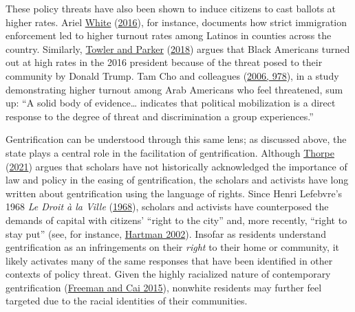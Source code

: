 \documentclass[
  12pt,
]{article}
\begin{document}
These policy threats have also been shown to induce citizens to cast ballots at higher rates. Ariel \protect\hyperlink{ref-White2016}{White} (\protect\hyperlink{ref-White2016}{2016}), for instance, documents how strict immigration enforcement led to higher turnout rates among Latinos in counties across the country. Similarly, \protect\hyperlink{ref-Towler2018}{Towler and Parker} (\protect\hyperlink{ref-Towler2018}{2018}) argues that Black Americans turned out at high rates in the 2016 president because of the threat posed to their community by Donald Trump. Tam Cho and colleagues (\protect\hyperlink{ref-TamCho2006a}{2006, 978}), in a study demonstrating higher turnout among Arab Americans who feel threatened, sum up: ``A solid body of evidence\ldots{} indicates that political mobilization is a direct response to the degree of threat and discrimination a group experiences.''

Gentrification can be understood through this same lens; as discussed above, the state plays a central role in the facilitation of gentrification. Although \protect\hyperlink{ref-Thorpe2021}{Thorpe} (\protect\hyperlink{ref-Thorpe2021}{2021}) argues that scholars have not historically acknowledged the importance of law and policy in the easing of gentrification, the scholars and activists have long written about gentrification using the language of rights. Since Henri Lefebvre's 1968 \emph{Le Droit à la Ville} (\protect\hyperlink{ref-Lefebvre1968}{1968}), scholars and activists have counterposed the demands of capital with citizens' ``right to the city'' and, more recently, ``right to stay put'' (see, for instance, \protect\hyperlink{ref-Hartman2002}{Hartman 2002}). Insofar as residents understand gentrification as an infringements on their \emph{right} to their home or community, it likely activates many of the same responses that have been identified in other contexts of policy threat. Given the highly racialized nature of contemporary gentrification (\protect\hyperlink{ref-Freeman2015}{Freeman and Cai 2015}), nonwhite residents may further feel targeted due to the racial identities of their communities.
\end{document}
